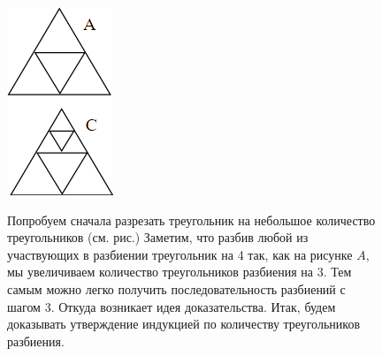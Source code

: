 {\setlength{\intextsep}{2pt}
\begin{figure}[h]
\begin{minipage}{0.15\linewidth}
    \includegraphics[width=0.95\columnwidth]{img/triangles1.png}
\end{minipage}
\hfill
\begin{minipage}{0.62\linewidth}\setlength{\parindent}{1.5em}
\begin{prf}
    Попробуем сначала разрезать треугольник на небольшое количество треугольников (см. рис.) Заметим, что разбив любой из участвующих в разбиении треугольник на 4 так, как на рисунке $A$, мы увеличиваем количество треугольников разбиения на 3. Тем самым можно легко получить последовательность разбиений с шагом 3. Откуда возникает идея доказательства. Итак, будем доказывать утверждение индукцией по количеству треугольников разбиения.

\end{prf}
\end{minipage}
\end{figure}}
